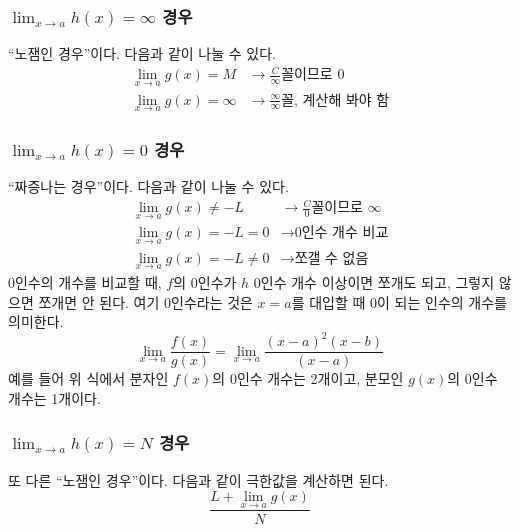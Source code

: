 \documentclass{scrartcl}
\begin{document}
\subsubsection{\texorpdfstring{\(\lim_{x\to a}h(x)=\infty\)}인 경우}
``노잼인 경우''이다. 다음과 같이 나눌 수 있다.
\begin{align*}
    \lim_{x\to a}g(x)=M&\longrightarrow\frac{C}{\infty}\text{꼴이므로 }0 \\
\lim_{x\to a}g(x)=\infty&\longrightarrow\frac{\infty}{\infty}\text{꼴, 계산해 봐야 함}
\end{align*}

\subsubsection{\texorpdfstring{\(\lim_{x\to a}h(x)=0\)}인 경우}
``짜증나는 경우''이다. 다음과 같이 나눌 수 있다.
\begin{align*}
\lim_{x\to a}g(x)\neq -L&\longrightarrow\frac{C}{0}\text{꼴이므로 }\infty \\
\lim_{x\to a}g(x)=-L=0&\longrightarrow\text{0인수 개수 비교} \\
\lim_{x\to a}g(x)=-L\neq 0&\longrightarrow\text{쪼갤 수 없음}
\end{align*}
0인수의 개수를 비교할 때, \(f\)의 0인수가 \(h\) 0인수 개수 이상이면 쪼개도 되고, 그렇지 않으면 쪼개면 안 된다. 여기 0인수라는 것은 \(x=a\)를 대입할 때 0이 되는 인수의 개수를 의미한다.
\[
\lim_{x\to a}\frac{f(x)}{g(x)}=\lim_{x\to a}\frac{(x-a)^2(x-b)}{(x-a)}
\]
예를 들어 위 식에서 분자인 \(f(x)\)의 0인수 개수는 2개이고, 분모인 \(g(x)\)의 0인수 개수는 1개이다.

\subsubsection{\texorpdfstring{\(\lim_{x\to a}h(x)=N\)}인 경우}
또 다른 ``노잼인 경우''이다. 다음과 같이 극한값을 계산하면 된다.
\[
\frac{L+\lim_{x\to a}g(x)}{N}
\]
\end{document}
